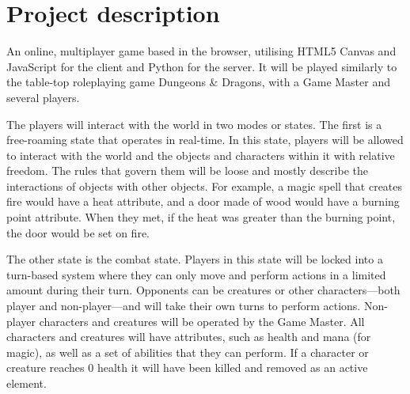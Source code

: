 \documentclass[11pt,fleqn,twoside]{article}
\begin{document}
\wordcount{}

\mmp

\setcounter{tocdepth}{3} %


\section{Project description}
An online, multiplayer game based in the browser, utilising HTML5 Canvas and JavaScript for the client and Python for the server. It will be played similarly to the table-top roleplaying game Dungeons \& Dragons, with a Game Master and several players.

The players will interact with the world in two modes or states. The first is a free-roaming state that operates in real-time. In this state, players will be allowed to interact with the world and the objects and characters within it with relative freedom. The rules that govern them will be loose and mostly describe the interactions of objects with other objects. For example, a magic spell that creates fire would have a heat attribute, and a door made of wood would have a burning point attribute. When they met, if the heat was greater than the burning point, the door would be set on fire.

The other state is the combat state. Players in this state will be locked into a turn-based system where they can only move and perform actions in a limited amount during their turn. Opponents can be creatures or other characters—both player and non-player—and will take their own turns to perform actions. Non-player characters and creatures will be operated by the Game Master. All characters and creatures will have attributes, such as health and mana (for magic), as well as a set of abilities that they can perform. If a character or creature reaches 0 health it will have been killed and removed as an active element.
\end{document}

